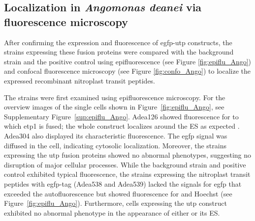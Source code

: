 


\subsection{Localization in \textit{Angomonas deanei} via fluorescence microscopy}
After confirming the expression and fluorescence of \gls{egfp}-\gls{utp} constructs, the  strains expressing these fusion proteins were compared with the background strain and the positive control using epifluorescence (see Figure \ref{fig:epiflu_Ango}) and confocal fluorescence microscopy (see Figure \ref{fig:confo_Ango}) to localize the expressed recombinant nitroplast transit peptides. 

\par The strains were first examined using epifluorescence microscopy. For the overview images of the single cells shown in Figure~\ref{fig:epiflu_Ango}, see Supplementary Figure~\ref{sup:epiflu_Ango}. Adea126 showed fluorescence for  to which \gls{etp}1 is fused; the whole construct localizes around the \gls{ES} as expected \parencite{morales_development_2016}. Adea304 also displayed its characteristic fluorescence. The \gls{egfp} signal was diffused in the cell, indicating cytosolic localization. Moreover, the strains expressing the \gls{utp} fusion proteins showed no abnormal phenotypes, suggesting no disruption of major cellular processes. While the background strain and positive control exhibited typical fluorescence, the  strains expressing the nitroplast transit peptides with \gls{egfp}-tag (Adea538 and Adea539) lacked the signals for \gls{egfp} that exceeded the autofluorescence but showed fluorescence for  and Hoechst (see Figure~\ref{fig:epiflu_Ango}). Furthermore, cells expressing the \gls{utp} construct exhibited no abnormal phenotype in the appearance of either  or its \gls{ES}.

